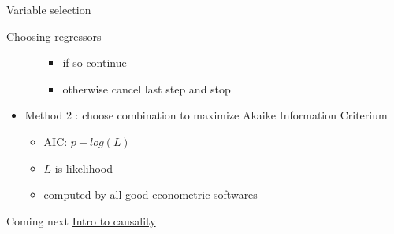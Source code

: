 \documentclass[
  ignorenonframetext,
  aspectratio=169,
]{beamer}
\providecommand{\tightlist}{%
  \setlength{\itemsep}{0pt}\setlength{\parskip}{0pt}}\usepackage{longtable,booktabs,array}
\begin{document}
\begin{frame}{Variable selection}
\begin{block}{Choosing regressors}
\begin{itemize}
\begin{itemize}
    \begin{itemize}
    \tightlist
    \item
      if so continue
    \item
      otherwise cancel last step and stop
    \end{itemize}
  \end{itemize}
\item
  Method 2 : choose combination to maximize Akaike Information Criterium

  \begin{itemize}
  \tightlist
  \item
    AIC: \(p - log(L)\)
  \item
    \(L\) is likelihood
  \item
    computed by all good econometric softwares
  \end{itemize}
\end{itemize}
\end{block}
\end{frame}

\begin{frame}{Coming next}
\protect\hypertarget{coming-next}{}
\href{5_intro_to_causality.html}{Intro to causality}
\end{frame}
\end{document}
